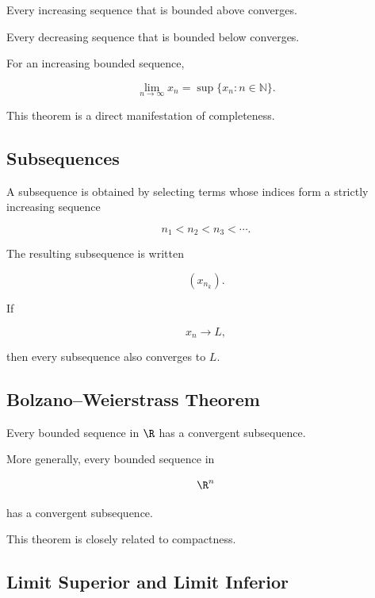 \begin{theorem}
Every increasing sequence that is bounded above converges.

Every decreasing sequence that is bounded below converges.
\end{theorem}

For an increasing bounded sequence,

\[
\boxed{
\lim_{n\to\infty}x_n
=
\sup\{x_n:n\in\mathbb{N}\}.
}
\]

This theorem is a direct manifestation of completeness.

\subsection{Subsequences}
\label{subsec:subsequences}

A subsequence is obtained by selecting terms whose indices form a strictly
increasing sequence

\[
n_1<n_2<n_3<\cdots.
\]

The resulting subsequence is written

\[
\boxed{
(x_{n_k}).
}
\]

If

\[
x_n\to L,
\]

then every subsequence also converges to \(L\).

\subsection{Bolzano--Weierstrass Theorem}
\label{subsec:bolzano-weierstrass}

\begin{theorem}
Every bounded sequence in \(\R\) has a convergent subsequence.
\end{theorem}

More generally, every bounded sequence in

\[
\R^n
\]

has a convergent subsequence.

This theorem is closely related to compactness.

\subsection{Limit Superior and Limit Inferior}
\label{subsec:limsup-liminf}


